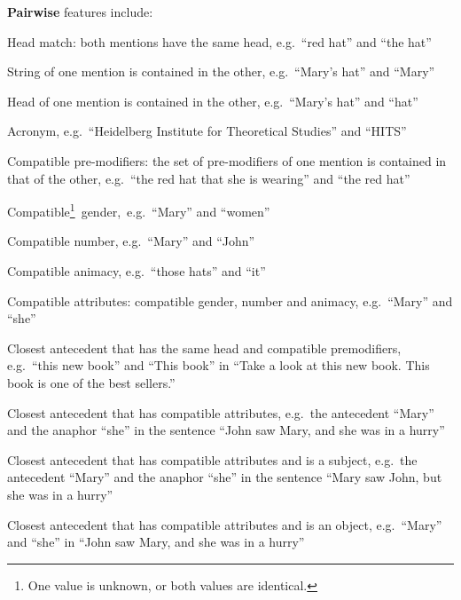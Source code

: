 \textbf{Pairwise} features include:
\squishlist
\item Head match: both mentions have the same head, e.g.\ ``red hat'' and ``the hat''
\item String of one mention is contained in the other, e.g.\ ``Mary's hat'' and ``Mary''
\item Head of one mention is contained in the other, e.g.\ ``Mary's hat'' and ``hat''
\item Acronym, e.g.\ ``Heidelberg Institute for Theoretical Studies'' and ``HITS'' 
\item Compatible pre-modifiers: the set of pre-modifiers of one mention is contained in that of the other, e.g.\ ``the red hat that she is wearing'' and ``the red hat''
\item Compatible\footnote{One value is unknown, or both values are identical.}\ gender,\ e.g.\ ``Mary'' and ``women''
\item Compatible number, e.g.\ ``Mary'' and ``John''
\item Compatible animacy, e.g.\ ``those hats'' and ``it'' 
\item Compatible attributes: compatible gender, number and animacy, e.g.\ ``Mary'' and ``she'' 
\item Closest antecedent that has the same head and compatible premodifiers, e.g.\ ``this new book'' and ``This book'' in ``Take a look at this new book. This book is one of the best sellers.''
\item Closest antecedent that has compatible attributes, e.g.\ the antecedent ``Mary'' and the anaphor ``she'' in the sentence ``John saw Mary, and she was in a hurry''
\item Closest antecedent that has compatible attributes and is a subject, e.g.\ the antecedent ``Mary'' and the anaphor ``she'' in the sentence ``Mary saw John, but she was in a hurry'' 
\item Closest antecedent that has compatible attributes and is an object, e.g.\ ``Mary'' and ``she'' in ``John saw Mary, and she was in a hurry''
\squishend
